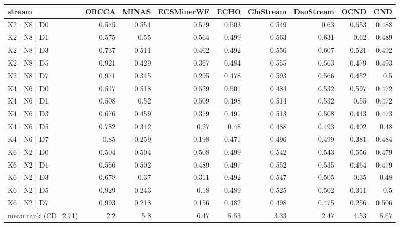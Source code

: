 \begin{tabular}{lrrrrrrrr}
\hline
 stream              &   ORCCA &   MINAS &   ECSMinerWF &   ECHO &   CluStream &   DenStream &   OCND &   CND \\
\hline
 K2 | N8 | D0        &   0.575 &   0.551 &        0.579 &  0.503 &       0.549 &       0.63  &  0.653 & 0.488 \\
 K2 | N8 | D1        &   0.575 &   0.55  &        0.564 &  0.499 &       0.563 &       0.631 &  0.62  & 0.489 \\
 K2 | N8 | D3        &   0.737 &   0.511 &        0.462 &  0.492 &       0.556 &       0.607 &  0.521 & 0.492 \\
 K2 | N8 | D5        &   0.921 &   0.429 &        0.367 &  0.484 &       0.555 &       0.563 &  0.479 & 0.493 \\
 K2 | N8 | D7        &   0.971 &   0.345 &        0.295 &  0.478 &       0.593 &       0.566 &  0.452 & 0.5   \\
 K4 | N6 | D0        &   0.517 &   0.518 &        0.529 &  0.501 &       0.484 &       0.532 &  0.597 & 0.472 \\
 K4 | N6 | D1        &   0.508 &   0.52  &        0.509 &  0.498 &       0.514 &       0.532 &  0.55  & 0.472 \\
 K4 | N6 | D3        &   0.676 &   0.459 &        0.379 &  0.491 &       0.513 &       0.508 &  0.443 & 0.473 \\
 K4 | N6 | D5        &   0.782 &   0.342 &        0.27  &  0.48  &       0.488 &       0.493 &  0.402 & 0.48  \\
 K4 | N6 | D7        &   0.85  &   0.259 &        0.198 &  0.471 &       0.496 &       0.499 &  0.381 & 0.484 \\
 K6 | N2 | D0        &   0.504 &   0.504 &        0.508 &  0.499 &       0.542 &       0.543 &  0.556 & 0.479 \\
 K6 | N2 | D1        &   0.556 &   0.502 &        0.489 &  0.497 &       0.552 &       0.535 &  0.464 & 0.479 \\
 K6 | N2 | D3        &   0.678 &   0.37  &        0.311 &  0.492 &       0.547 &       0.505 &  0.35  & 0.48  \\
 K6 | N2 | D5        &   0.929 &   0.243 &        0.18  &  0.489 &       0.525 &       0.502 &  0.311 & 0.5   \\
 K6 | N2 | D7        &   0.993 &   0.218 &        0.156 &  0.482 &       0.498 &       0.475 &  0.256 & 0.506 \\
 mean rank (CD=2.71) &   2.2   &   5.8   &        6.47  &  5.53  &       3.33  &       2.47  &  4.53  & 5.67  \\
\hline
\end{tabular}